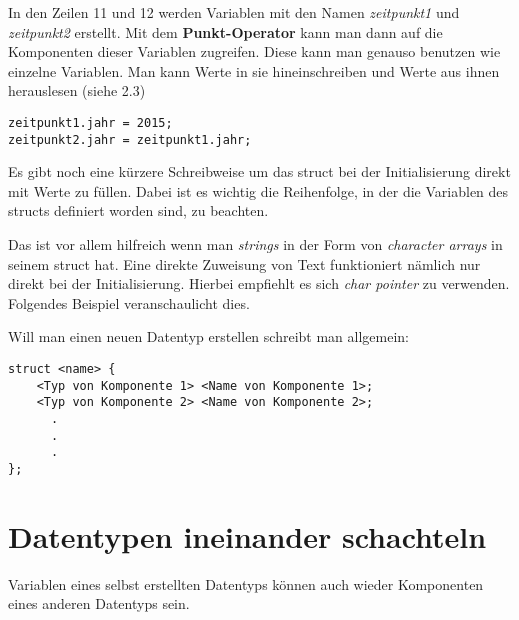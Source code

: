 \documentclass[c_worksheet.tex]{subfiles}
\begin{document}
In den Zeilen 11 und 12 werden Variablen mit den Namen \textit{zeitpunkt1} und \textit{zeitpunkt2} erstellt. Mit dem \textbf{Punkt-Operator} kann man dann auf die Komponenten dieser Variablen zugreifen. Diese kann man genauso benutzen wie einzelne Variablen. Man kann Werte in sie hineinschreiben und Werte aus ihnen herauslesen (siehe 2.3)

\begin{lstlisting}
zeitpunkt1.jahr = 2015;
zeitpunkt2.jahr = zeitpunkt1.jahr;
\end{lstlisting}

Es gibt noch eine kürzere Schreibweise um das struct bei der Initialisierung direkt mit Werte zu füllen. Dabei ist es wichtig die Reihenfolge, in der die Variablen des structs definiert worden sind, zu beachten.



Das ist vor allem hilfreich wenn man \emph{strings} in der Form von \emph{character arrays} in seinem struct hat. Eine direkte Zuweisung von Text funktioniert nämlich nur direkt bei der Initialisierung. Hierbei empfiehlt es sich \emph{char pointer} zu verwenden. Folgendes Beispiel veranschaulicht dies.

 


Will man einen neuen Datentyp erstellen schreibt man allgemein:
\begin{lstlisting}
struct <name> {
    <Typ von Komponente 1> <Name von Komponente 1>;
    <Typ von Komponente 2> <Name von Komponente 2>;
      .
      .
      .
};
\end{lstlisting}

\section{Datentypen ineinander schachteln}

Variablen eines selbst erstellten Datentyps können auch wieder Komponenten eines anderen Datentyps sein.
\end{document}
